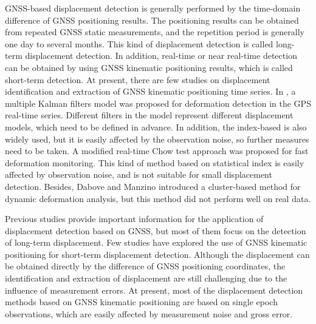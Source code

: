 \documentclass[final,3p,times]{elsarticle}
\begin{document}
	\textcolor{r_s}{
	GNSS-based displacement detection is generally performed by the time-domain difference of GNSS positioning results\cite{abidin2004use,rs12203375}. The positioning results can be obtained from repeated GNSS static measurements, and the repetition period is generally one day to several months. This kind of displacement detection is called long-term displacement detection. In addition, real-time or near real-time detection can be obtained by using GNSS kinematic positioning results, which is called short-term detection.}
	At present, there are few studies on displacement identification and extraction of GNSS kinematic positioning time series. In \cite{li2010deformation}, a multiple Kalman filters model was proposed for deformation detection in the GPS real-time series. Different filters in the model represent different displacement models, which need to be defined in advance. 
	In addition, the index-based is also widely used, but it is easily affected by the observation noise, so further measures need to be taken\cite{shen_shortterm2021}.
	A modified real-time Chow test approach was proposed for fast deformation monitoring\cite{bellone2016real}. This kind of method based on statistical index is easily affected by observation noise, and is not suitable for small displacement detection\cite{pirotti2015micro}. Besides, Dabove and Manzino\cite{dabove2016fast} introduced a cluster-based method for dynamic deformation analysis, but this method did not perform well on real data.
	
	Previous studies provide important information for the application of displacement detection based on GNSS, but most of them focus on the detection of long-term displacement. 
	Few studies have explored the use of GNSS kinematic positioning for short-term displacement detection. 
	Although the displacement can be obtained directly by the difference of GNSS positioning coordinates, the identification and extraction of displacement are still challenging due to the influence of measurement errors.
	At present, most of the displacement detection methods based on GNSS kinematic positioning are based on single epoch observations, which are easily affected by measurement noise and gross error.
	
\end{document}
